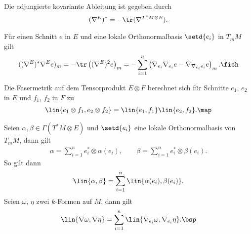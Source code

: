 \documentclass[%
	paper=a5,%
	fleqn,%
	DIV=18,%
	BCOR=0mm,
	fontsize=11pt,
	titlepage=false,%
	bibliography=totoc,
	DIV=18,%
	twoside=true,
	pdftitle=Riemannsche Geometrie,
	pdfauthor=Uwe Semmelmann,
	numbers=noendperiod]%
	{scrbook}
\begin{document}
\begin{lem}
\begin{propenum}
\item Die adjungierte kovariante Ableitung ist gegeben durch
\begin{align*}
(\nabla^E)^* = -\tr(\nabla^{T^*M\otimes E}).
\end{align*}
\item Für einen Schnitt $e$ in $E$ und eine lokale Orthonormalbasis $\setd{e_{i}}$ in $T_{m}M$ gilt
\begin{align*}
((\nabla^E)^*\nabla^E e)_{m} = -\tr\left((\nabla^E)^2e\right)_{m} = 
-\sum_{i=1}^n \left(\nabla_{e_{i}}\nabla_{e_{i}}e - \nabla_{\nabla_{e_{i}}e_{i}}e \right)_{m}.\fish
\end{align*}
\end{propenum}
\end{lem}

\begin{rem}
Die Fasermetrik auf dem Tensorprodukt $E\otimes F$ berechnet sich für Schnitte $e_{1}$, $e_{2}$ in $E$ und $f_{1}$, $f_{2}$ in $F$ zu
\begin{align*}
\lin{e_{1}\otimes f_{1},e_{2}\otimes f_{2}} = \lin{e_{1},f_{1}}\lin{e_{2},f_{2}}.\map
\end{align*}
\end{rem}

\begin{ex}
Seien $\alpha,\beta\in\Gamma(T^*M\otimes E)$ und $\setd{e_{i}}$ eine lokale Orthonormalbasis von $T_{m}M$, dann gilt
\begin{align*}
\alpha = \sum_{i=1}^n e_{i}^* \otimes \alpha(e_{i}),\qquad
\beta = \sum_{i=1}^n e_{i}^* \otimes \beta(e_{i}).
\end{align*}
So gilt dann
\begin{align*}
\lin{\alpha,\beta} = \sum_{i=1}^n \lin{\alpha(e_{i}),\beta(e_{i})}.
\end{align*}
Seien $\omega$, $\eta$ zwei $k$-Formen auf $M$, dann gilt
\begin{align*}
\lin{\nabla \omega, \nabla \eta} = \sum_{i=1}^n \lin{\nabla_{e_{i}}\omega, \nabla_{e_{i}}\eta}.\bsp
\end{align*}
\end{ex}
\end{document}
